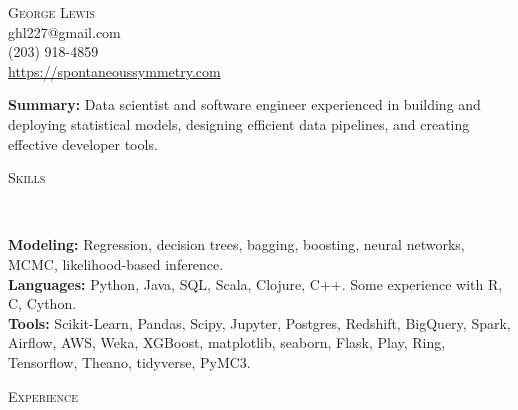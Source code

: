 \documentclass[9pt]{article}
\newenvironment{changemargin}[2]{%
  \begin{list}{}{%
    \setlength{\topsep}{0pt}%
    \setlength{\leftmargin}{#1}%
    \setlength{\rightmargin}{#2}%
    \setlength{\listparindent}{\parindent}%
    \setlength{\itemindent}{\parindent}%
    \setlength{\parsep}{\parskip}%
  }%
  \item[]}{\end{list}
}
\newcommand{\lineover}{
  \begin{changemargin}{-0.05in}{-0.05in}
    \vspace*{-8pt}
    \hrulefill \\
    \vspace*{-2pt}
  \end{changemargin}
}
\newcommand{\header}[1]{
  \begin{changemargin}{-0.5in}{-0.5in}
    \scshape{#1}\\
    \lineover
  \end{changemargin}
}
\newcommand{\contact}[4]{
  \begin{changemargin}{-0.5in}{-0.5in}
    \begin{center}
      {\Large \scshape {#1}}\\ \smallskip
      {#2}\\ \smallskip
      {#3}\\ \smallskip
      {#4}\smallskip
    \end{center}
  \end{changemargin}
}
\newenvironment{body} {
  \vspace*{-16pt}
\begin{changemargin}{-0.25in}{-0.5in}
  }
{\end{changemargin}
}
\begin{document}
\contact{George Lewis}
        {ghl227@gmail.com}
        {(203) 918-4859}
        {\url{https://spontaneoussymmetry.com}}
\smallskip

\begin{body}
  \vspace{14pt}
  \textbf{Summary:}{} Data scientist and software engineer experienced in building and deploying statistical models, designing efficient data pipelines, and creating effective developer tools.

\end{body}

\smallskip

\header{Skills}
\begin{body}
  \vspace{14pt}
  \textbf{Modeling:}{} Regression, decision trees, bagging, boosting, neural networks, MCMC, likelihood-based inference. \\
  \textbf{Languages:}{} Python, Java, SQL, Scala, Clojure, C++.  Some experience with R, C, Cython. \\
  \textbf{Tools:}{} Scikit-Learn, Pandas, Scipy, Jupyter, Postgres, Redshift, BigQuery, Spark, Airflow, AWS, Weka, XGBoost, matplotlib, seaborn, Flask, Play, Ring,  Tensorflow, Theano, tidyverse, PyMC3.  \\
\end{body}

\smallskip

\header{Experience}
\end{document}

